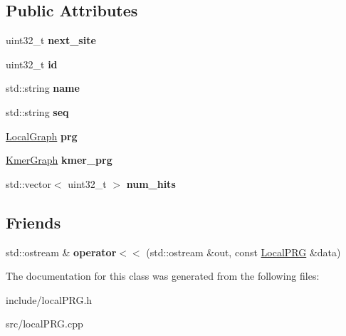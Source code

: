 \subsection*{Public Attributes}
\begin{DoxyCompactItemize}
\item 
\mbox{\label{classLocalPRG_abf9e601dc3d00bb4e574da95324cbc15}} 
uint32\+\_\+t {\bfseries next\+\_\+site}
\item 
\mbox{\label{classLocalPRG_ae0b0928141665bf209eba94cb46972a2}} 
uint32\+\_\+t {\bfseries id}
\item 
\mbox{\label{classLocalPRG_a101b866a36a0721ad6985c0442f9ac10}} 
std\+::string {\bfseries name}
\item 
\mbox{\label{classLocalPRG_a1a32007bf210ecb5b06e135aca50a372}} 
std\+::string {\bfseries seq}
\item 
\mbox{\label{classLocalPRG_a0c3ca6e8a8568a7bb2d8f5860d29aa45}} 
\hyperlink{classLocalGraph}{Local\+Graph} {\bfseries prg}
\item 
\mbox{\label{classLocalPRG_aef3aece10be2745d990a37913011f5a9}} 
\hyperlink{classKmerGraph}{Kmer\+Graph} {\bfseries kmer\+\_\+prg}
\item 
\mbox{\label{classLocalPRG_a276b54851100a10b334306856bfb230d}} 
std\+::vector$<$ uint32\+\_\+t $>$ {\bfseries num\+\_\+hits}
\end{DoxyCompactItemize}
\subsection*{Friends}
\begin{DoxyCompactItemize}
\item 
\mbox{\label{classLocalPRG_a8f0ba3182680e495c26f00482617b684}} 
std\+::ostream \& {\bfseries operator$<$$<$} (std\+::ostream \&out, const \hyperlink{classLocalPRG}{Local\+P\+RG} \&data)
\end{DoxyCompactItemize}


The documentation for this class was generated from the following files\+:\begin{DoxyCompactItemize}
\item 
include/local\+P\+R\+G.\+h\item 
src/local\+P\+R\+G.\+cpp\end{DoxyCompactItemize}
